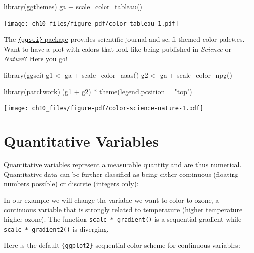 \documentclass[
  letterpaper,
  DIV=11,
  numbers=noendperiod]{scrreprt}
\newenvironment{Shaded}{\begin{snugshade}}{\end{snugshade}}
\newcommand{\AttributeTok}[1]{\textcolor[rgb]{0.40,0.45,0.13}{#1}}
\newcommand{\FunctionTok}[1]{\textcolor[rgb]{0.28,0.35,0.67}{#1}}
\newcommand{\NormalTok}[1]{\textcolor[rgb]{0.00,0.23,0.31}{#1}}
\newcommand{\OtherTok}[1]{\textcolor[rgb]{0.00,0.23,0.31}{#1}}
\newcommand{\SpecialCharTok}[1]{\textcolor[rgb]{0.37,0.37,0.37}{#1}}
\newcommand{\StringTok}[1]{\textcolor[rgb]{0.13,0.47,0.30}{#1}}
\begin{document}
\begin{Shaded}
\begin{Highlighting}[]
\FunctionTok{library}\NormalTok{(ggthemes)}
\NormalTok{ga }\SpecialCharTok{+} \FunctionTok{scale\_color\_tableau}\NormalTok{()}
\end{Highlighting}
\end{Shaded}

\texttt{[image: ch10\_files/figure-pdf/color-tableau-1.pdf]}

The \href{https://nanx.me/ggsci/articles/ggsci.html}{\texttt{\{ggsci\}}
package} provides scientific journal and sci-fi themed color palettes.
Want to have a plot with colors that look like being published in
\emph{Science} or \emph{Nature}? Here you go!

\begin{Shaded}
\begin{Highlighting}[]
\FunctionTok{library}\NormalTok{(ggsci)}
\NormalTok{g1 }\OtherTok{\textless{}{-}}\NormalTok{ ga }\SpecialCharTok{+} \FunctionTok{scale\_color\_aaas}\NormalTok{()}
\NormalTok{g2 }\OtherTok{\textless{}{-}}\NormalTok{ ga }\SpecialCharTok{+} \FunctionTok{scale\_color\_npg}\NormalTok{()}

\FunctionTok{library}\NormalTok{(patchwork)}
\NormalTok{(g1 }\SpecialCharTok{+}\NormalTok{ g2) }\SpecialCharTok{*} \FunctionTok{theme}\NormalTok{(}\AttributeTok{legend.position =} \StringTok{"top"}\NormalTok{)}
\end{Highlighting}
\end{Shaded}

\texttt{[image: ch10\_files/figure-pdf/color-science-nature-1.pdf]}

\section{Quantitative Variables}\label{quantitative-variables}

Quantitative variables represent a measurable quantity and are thus
numerical. Quantitative data can be further classified as being either
continuous (floating numbers possible) or discrete (integers only):

In our example we will change the variable we want to color to ozone, a
continuous variable that is strongly related to temperature (higher
temperature = higher ozone). The function \texttt{scale\_*\_gradient()}
is a sequential gradient while \texttt{scale\_*\_gradient2()} is
diverging.

Here is the default \texttt{\{ggplot2\}} sequential color scheme for
continuous variables:
\end{document}
